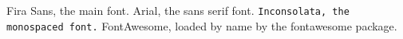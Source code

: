 \documentclass{article}
\begin{document}
Fira Sans, the main font. \textsf{Arial, the sans serif font.}
\texttt{Inconsolata, the monospaced font.}
\faGithub{} FontAwesome, loaded by name by the fontawesome package.
\end{document}
